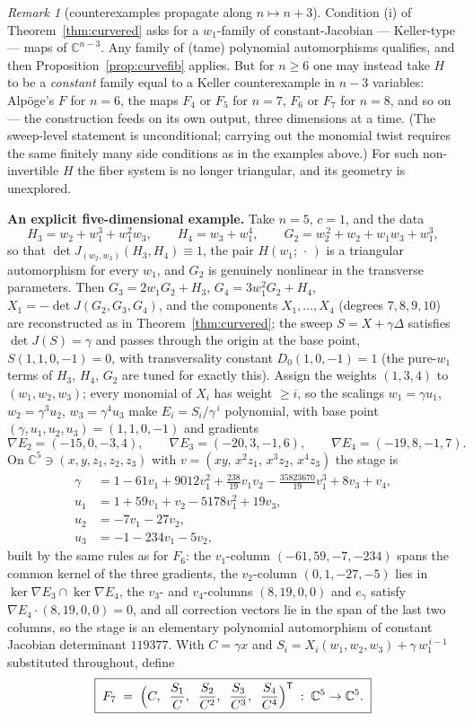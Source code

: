 \documentclass[11pt]{article}
\theoremstyle{plain}
\theoremstyle{definition}
\theoremstyle{remark}
\newtheorem{remark}[theorem]{Remark}
\newcommand{\C}{\mathbb{C}}
\begin{document}
\begin{remark}[counterexamples propagate along $n\mapsto n+3$]
Condition (i) of Theorem~\ref{thm:curvered} asks for a $w_1$-family of
constant-Jacobian --- Keller-type --- maps of $\C^{n-3}$. Any family of
(tame) polynomial automorphisms qualifies, and then
Proposition~\ref{prop:curvefib} applies. But for $n\ge6$ one may instead take
$H$ to be a \emph{constant} family equal to a Keller counterexample in $n-3$
variables: Alp\"oge's $F$ for $n=6$, the maps $F_4$ or $F_5$ for $n=7$, $F_6$
or $F_7$ for $n=8$, and so on --- the construction feeds on its own output,
three dimensions at a time. (The sweep-level statement is unconditional;
carrying out the monomial twist requires the same finitely many side
conditions as in the examples above.) For such non-invertible $H$ the fiber
system is no longer triangular, and its geometry is unexplored.
\end{remark}

\medskip\noindent\textbf{An explicit five-dimensional example.} Take $n=5$,
$c=1$, and the data
\[
H_3=w_2+w_1^3+w_1^2w_3,\qquad
H_4=w_3+w_1^4,\qquad
G_2=w_2^{\,2}+w_2+w_1w_3+w_1^3 ,
\]
so that $\det J_{(w_2,w_3)}(H_3,H_4)\equiv1$, the pair
$H(w_1;\,\cdot\,)$ is a triangular automorphism for every $w_1$, and $G_2$ is
genuinely nonlinear in the transverse parameters. Then $G_3=2w_1G_2+H_3$,
$G_4=3w_1^2G_2+H_4$, $X_1=-\det J(G_2,G_3,G_4)$, and the components
$X_1,\dots,X_4$ (degrees $7,8,9,10$) are reconstructed as in
Theorem~\ref{thm:curvered}; the sweep $S=X+\gamma\Delta$ satisfies
$\det J(S)=\gamma$ and passes through the origin at the base point,
$S(1,1,0,-1)=0$, with transversality constant $D_0(1,0,-1)=1$ (the pure-$w_1$
terms of $H_3$, $H_4$, $G_2$ are tuned for exactly this). Assign the weights
$(1,3,4)$ to $(w_1,w_2,w_3)$; every monomial of $X_i$ has weight $\ge i$, so
the scalings $w_1=\gamma u_1$, $w_2=\gamma^3u_2$, $w_3=\gamma^4u_3$ make
$E_i=S_i/\gamma^{\,i}$ polynomial, with base point
$(\gamma,u_1,u_2,u_3)=(1,1,0,-1)$ and gradients
\[
\nabla E_2=(-15,0,-3,4),\qquad
\nabla E_3=(-20,3,-1,6),\qquad
\nabla E_4=(-19,8,-1,7).
\]
On $\C^5\ni(x,y,z_1,z_2,z_3)$ with $v=(xy,\,x^2z_1,\,x^3z_2,\,x^4z_3)$ the
stage is
\[
\begin{aligned}
\gamma&=1-61v_1+9012v_1^2+\tfrac{238}{19}v_1v_2-\tfrac{35823670}{19}v_1^3+8v_3+v_4,\\
u_1&=1+59v_1+v_2-5178v_1^2+19v_3,\\
u_2&=-7v_1-27v_2,\\
u_3&=-1-234v_1-5v_2 ,
\end{aligned}
\]
built by the same rules as for $F_6$: the $v_1$-column $(-61,59,-7,-234)$
spans the common kernel of the three gradients, the $v_2$-column
$(0,1,-27,-5)$ lies in $\ker\nabla E_3\cap\ker\nabla E_4$, the $v_3$- and
$v_4$-columns $(8,19,0,0)$ and $e_\gamma$ satisfy $\nabla E_4\cdot(8,19,0,0)=0$,
and all correction vectors lie in the span of the last two columns, so the
stage is an elementary polynomial automorphism of constant Jacobian
determinant $119377$. With $C=\gamma x$ and
$S_i=X_i(w_1,w_2,w_3)+\gamma\,w_1^{\,i-1}$ substituted throughout, define
\[
\boxed{\;F_7\;=\;\Bigl(C,\;\;\frac{S_1}{C},\;\;\frac{S_2}{C^2},\;\;
\frac{S_3}{C^3},\;\;\frac{S_4}{C^4}\Bigr)^{\mathsf T}\;:\;\C^5\to\C^5 .\;}
\]
\end{document}
